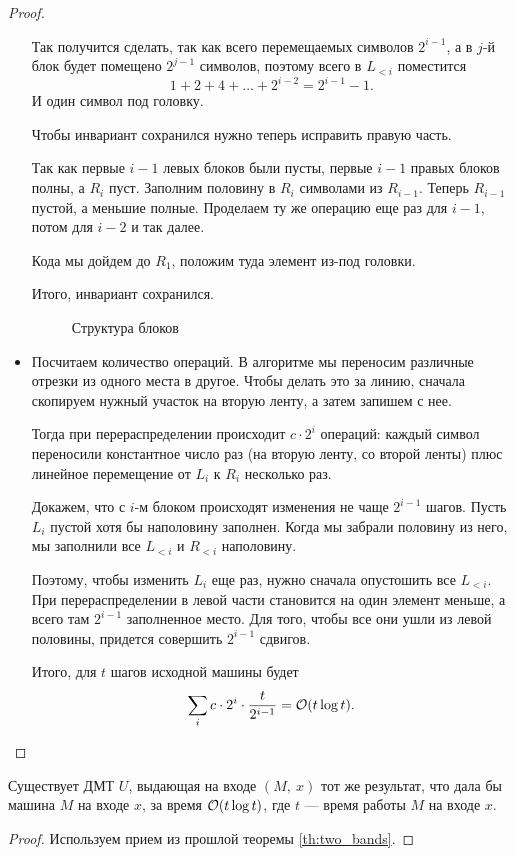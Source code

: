 \begin{proof}
\begin{itemize}
			Так получится сделать, так как всего перемещаемых символов $ 2^{i-1}$, а в $ j$-й блок будет помещено $ 2^{j-1}$ символов, поэтому всего в $ L_{<i}$ поместится  
			\[
				1 + 2 + 4 + \ldots + 2^{i-2} = 2^{i-1} - 1
			.\] 
			И один символ под головку.

			Чтобы инвариант сохранился нужно теперь исправить правую часть.

			Так как первые $ i-1$ левых блоков были пусты, первые $ i-1$ правых блоков полны, а $ R_i$ пуст. 
			Заполним половину в $ R_i$ символами из $ R_{i-1}$.
			Теперь $ R_{i-1}$ пустой, а меньшие полные. Проделаем ту же операцию еще раз для $ i-1$, потом для $ i-2$ и так далее.

			Кода мы дойдем до $ R_1$, положим туда элемент из-под головки.

			Итого, инвариант  сохранился.
		\begin{figure}[ht]
			\centering
			\caption{Структура блоков}
			\label{fig:blocks}
		\end{figure}
		\item Посчитаем количество операций. В алгоритме мы переносим различные отрезки из одного места в другое. Чтобы делать это за линию, сначала скопируем нужный участок на вторую ленту, а затем запишем с нее.

			Тогда при перераспределении происходит $ c\cdot 2^{i}$ операций: каждый символ переносили константное число раз (на вторую ленту, со второй ленты)  плюс линейное перемещение от $ L_i$ к $ R_i$ несколько раз.
			
			Докажем, что с $ i$-м блоком происходят изменения не чаще $ 2^{i-1}$  шагов. Пусть $ L_i$ пустой хотя бы наполовину заполнен. Когда мы забрали половину из него, мы заполнили все $ L_{<i}$ и $ R_{<i}$ наполовину. 

			Поэтому, чтобы изменить $ L_i$ еще раз, нужно сначала опустошить все $ L_{<i}$. 
			При перераспределении в левой части становится на один элемент меньше, а всего там $ 2^{i-1}$ заполненное место. Для того, чтобы все они ушли из левой половины, придется совершить $ 2^{i-1}$ сдвигов.

			Итого, для $ t$ шагов исходной машины будет 
			\[
				\sum_{i}^{}c\cdot 2^{i} \cdot \frac{t}{2^{i-1}} = \mathcal{O}(t \log t)
			.\] 
	\end{itemize}
\end{proof}

\begin{thm}[Об универсальной МТ]
	Существует ДМТ $ U$, выдающая на входе $(M, ~ x)$ тот же результат, что дала бы машина $ M$ на входе $ x$, за время $ \mathcal{O}(t \log t)$, где $ t $ --- время работы $ M$ на входе $ x$.
\end{thm}
\begin{proof}
	Используем прием из прошлой теоремы \ref{th:two_bands}.
\end{proof}

